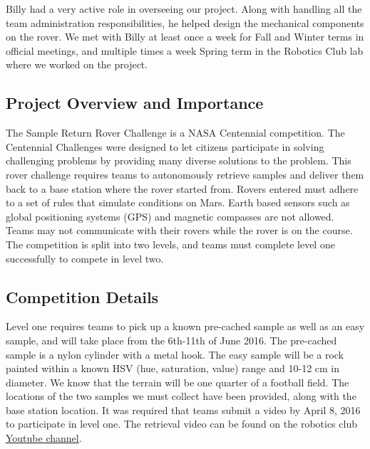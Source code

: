 \documentclass[10pt, oneside,onecolumn]{IEEEtran}
\begin{document}
Billy had a very active role in overseeing our project. Along with handling all the team administration responsibilities, he helped design the mechanical components on the rover. We met with Billy at least once a week for Fall and Winter terms in official meetings, and multiple times a week Spring term in the Robotics Club lab where we worked on the project. 

\subsection{Project Overview and Importance}

The Sample Return Rover Challenge is a NASA Centennial competition. The Centennial Challenges were designed to let citizens participate in solving challenging problems by providing many diverse solutions to the problem. This rover challenge requires teams to autonomously retrieve samples and deliver them back to a base station where the rover started from. Rovers entered must adhere to a set of rules that simulate conditions on Mars. Earth based sensors such as global positioning systems (GPS) and magnetic compasses are not allowed. Teams may not communicate with their rovers while the rover is on the course. The competition is split into two levels, and teams must complete level one successfully to compete in level two. 

\subsection{Competition Details}

Level one requires teams to pick up a known pre-cached sample as well as an easy sample, and will take place from the 6th-11th of June 2016. The pre-cached sample is a nylon cylinder with a metal hook. The easy sample will be a rock painted within a known HSV (hue, saturation, value) range and 10-12 cm in diameter. We know that the terrain will be one quarter of a football field. The locations of the two samples we must collect have been provided, along with the base station location. It was required that teams submit a video by April 8, 2016 to participate in level one. The retrieval video can be found on the robotics club \href{https://www.youtube.com/watch?v=H8sDekAOodg}{Youtube channel}.
\end{document}
